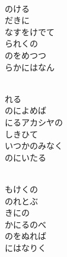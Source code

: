 \documentclass[10pt,b5j]{tarticle} %
\begin{document}
\vspace{1.5em} %
\newcommand{\linespace}{0.5em} %
\newcommand{\blocksize}{0.5\hsize} %
\newcommand{\itemmargin}{3em} %
\begin{enumerate} %
    \setlength{\itemindent}{\itemmargin} %
    \begin{minipage}[c]{\blocksize}
    
        \vspace{\linespace}
        \item~\\
        のける\\
        だきに\\
        なすをけでて\\
        られくの\\
        のをめつつ\\
        らかにはなん
        
    \end{minipage}
    \begin{minipage}[c]{\blocksize}
        
        \vspace{\linespace}
        \item~\\
        れる\\
        のによめば\\
        にるアカシヤの\\
        しきひて\\
        いつかのみなく\\
        のにいたる
        
    \end{minipage}
    \begin{minipage}[c]{\blocksize}
        
        \vspace{\linespace}
        \item~\\
        もけくの\\
        のれとぶ\\
        きにの\\
        かにるのべ\\
        のをぬれば\\
        にはなりく
        

\end{minipage}
\end{enumerate}
\end{document}
